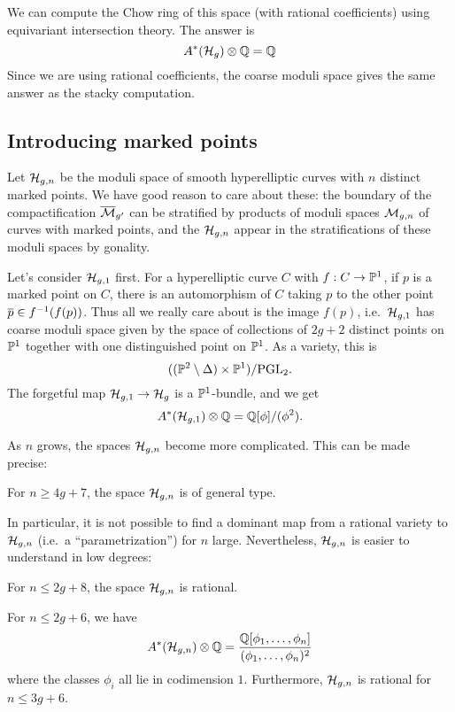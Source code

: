 \documentclass{amsart}
\begin{document}
We can compute the Chow ring of this space (with rational coefficients) using equivariant intersection theory.
The answer is
\[
	A^*(\mathcal{H}_g) \otimes \mathbb{Q} = \mathbb{Q}
\]
Since we are using rational coefficients, the coarse moduli space gives the same answer as the stacky computation.

\subsection{Introducing marked points}

Let $\mathcal{H}_{g,n}$ be the moduli space of smooth hyperelliptic curves with $n$ distinct marked points.
We have good reason to care about these: the boundary of the compactification $\overline{\mathcal{M}}_{g'}$ can be stratified by products of moduli spaces $\mathcal{M}_{g,n}$ of curves with marked points, and the $\mathcal{H}_{g,n}$ appear in the stratifications of these moduli spaces by gonality.

Let's consider $\mathcal{H}_{g,1}$ first.
For a hyperelliptic curve $C$ with $f: C \to \mathbb{P}^1$, if $p$ is a marked point on $C$, there is an automorphism of $C$ taking $p$ to the other point $\overline{p} \in f^{-1}(f(p))$.
Thus all we really care about is the image $f(p)$, i.e.\ $\mathcal{H}_{g,1}$ has coarse moduli space given by the space of collections of $2g+2$ distinct points on $\mathbb{P}^1$ together with one distinguished point on $\mathbb{P}^1$.
As a variety, this is
\[
	((\mathbb{P}^2 \setminus \Delta) \times \mathbb{P}^1) / \mathrm{PGL}_2.
\]
The forgetful map $\mathcal{H}_{g,1} \to \mathcal{H}_g$ is a $\mathbb{P}^1$-bundle, and we get
\[
	A^*(\mathcal{H}_{g,1}) \otimes \mathbb{Q} = \mathbb{Q}[\phi] / (\phi^2).
\]

As $n$ grows, the spaces $\mathcal{H}_{g,n}$ become more complicated.
This can be made precise:

\begin{thm}
	For $n \geq 4g + 7$, the space $\mathcal{H}_{g,n}$ is of general type.
\end{thm}

In particular, it is not possible to find a dominant map from a rational variety to $\mathcal{H}_{g,n}$ (i.e.\ a ``parametrization'') for $n$ large.
Nevertheless, $\mathcal{H}_{g,n}$ is easier to understand in low degrees:

\begin{thm}[Casnati]
	For $n \leq 2g + 8$, the space $\mathcal{H}_{g,n}$ is rational.
\end{thm}

\begin{thm}
	For $n \leq 2g + 6$, we have
	\[
		A^*(\mathcal{H}_{g,n}) \otimes \mathbb{Q} = \frac{\mathbb{Q}[\phi_1, \dots, \phi_n]}{(\phi_1, \dots, \phi_n)^2}
	\]
	where the classes $\phi_i$ all lie in codimension $1$.
	Furthermore, $\mathcal{H}_{g,n}$ is rational for $n \leq 3g + 6$.
\end{thm}
\end{document}
